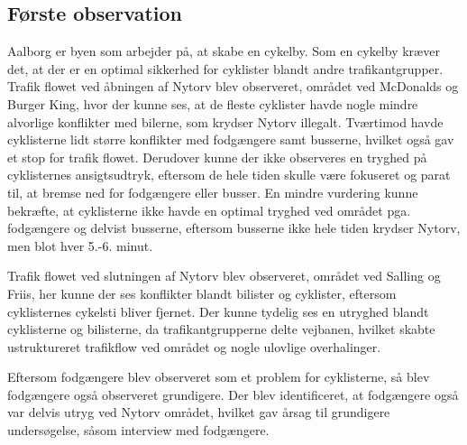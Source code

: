 \subsection{Første observation}
\label{sub:foerste_obs}
Aalborg er byen som arbejder på, at skabe en cykelby.%
Som en cykelby kræver det, at der er en optimal sikkerhed for cyklister blandt andre trafikantgrupper. Trafik flowet ved åbningen af Nytorv blev observeret, området ved McDonalds og Burger King, hvor der kunne ses, at de fleste cyklister havde nogle mindre alvorlige konflikter med bilerne, som krydser Nytorv illegalt. Tværtimod havde cyklisterne lidt større konflikter med fodgængere samt busserne, hvilket også gav et stop for trafik flowet. Derudover kunne der ikke observeres en tryghed på cyklisternes ansigtsudtryk, eftersom de hele tiden skulle være fokuseret og parat til, at bremse ned for fodgængere eller busser. En mindre vurdering kunne bekræfte, at cyklisterne ikke havde en optimal tryghed ved området pga. fodgængere og delvist busserne, eftersom busserne ikke hele tiden krydser Nytorv, men blot hver 5.-6. minut.

Trafik flowet ved slutningen af Nytorv blev observeret, området ved Salling og Friis, her kunne der ses konflikter blandt bilister og cyklister, eftersom cyklisternes cykelsti bliver fjernet. Der kunne tydelig ses en utryghed blandt cyklisterne og bilisterne, da trafikantgrupperne delte vejbanen, hvilket skabte ustruktureret trafikflow ved området og nogle ulovlige overhalinger.

Eftersom fodgængere blev observeret som et problem for cyklisterne, så blev fodgængere også observeret grundigere. Der blev identificeret, at fodgængere også var delvis utryg ved Nytorv området, hvilket gav årsag til grundigere undersøgelse, såsom interview med fodgængere.

